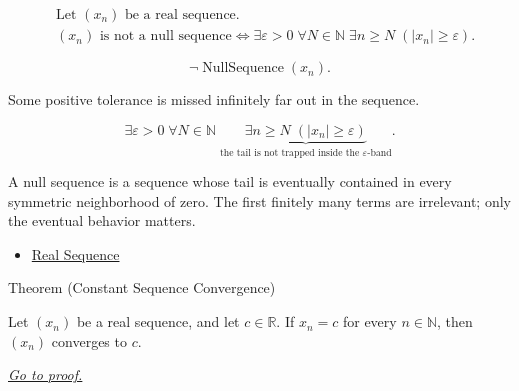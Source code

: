 \begin{remark*}
\[
\begin{aligned}
&\text{Let } (x_n) \text{ be a real sequence.}\\
&(x_n) \text{ is not a null sequence}
\Longleftrightarrow
\exists \varepsilon > 0\;
\forall N \in \mathbb{N}\;
\exists n \ge N\;(|x_n| \ge \varepsilon).
\end{aligned}
\]
\end{remark*}

\begin{remark*}
\[
\neg\operatorname{NullSequence}(x_n).
\]
\end{remark*}

\begin{remark*}
Some positive tolerance is missed infinitely far out in the sequence.
\end{remark*}

\begin{remark*}
\[
\exists \varepsilon > 0\;
\forall N \in \mathbb{N}\;
\underbrace{\exists n \ge N\;(|x_n| \ge \varepsilon)}
_{\text{the tail is not trapped inside the } \varepsilon\text{-band}}.
\]
\end{remark*}

\begin{remark*}[Interpretation]
A null sequence is a sequence whose tail is eventually contained in every
symmetric neighborhood of zero. The first finitely many terms are irrelevant;
only the eventual behavior matters.
\end{remark*}

\begin{dependencies}
\begin{itemize}
  \item \hyperref[def:real-sequence]{Real Sequence}
\end{itemize}
\end{dependencies}


\begin{theorembox}{Theorem (Constant Sequence Convergence)}
\begin{theorem}
\label{thm:constant-sequence-convergence}
Let $(x_n)$ be a real sequence, and let $c \in \mathbb{R}$. If $x_n = c$
for every $n \in \mathbb{N}$, then $(x_n)$ converges to $c$.

\smallskip
\noindent
\hyperref[prf:constant-sequence-convergence]{\textit{Go to proof.}}
\end{theorem}
\end{theorembox}

